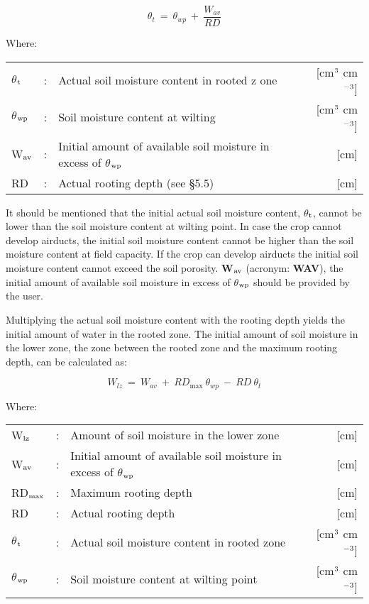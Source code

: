 \begin{equation}
\label{eq:6.18}
\theta_{t} ~ =~\theta_{wp} ~+~{\frac{W_{av}}{RD}}
\end{equation}

Where:\\[5pt]
\begin{tabularx}{\textwidth}{llXr}
	$\theta$$_{{\rm t}}$ &:& Actual soil moisture content in rooted z
	one  & [cm$^{{\rm 3}}$ cm$^{{\rm -3}}$]\\
	$\theta$$_{{\rm wp}}$ &:& Soil moisture content at wilting   & [cm$^{{\rm 3}}$ cm$^{{\rm -3}}$]\\
	W$_{{\rm av}}$ &:& Initial amount of available soil moisture 
	in excess of $\theta$$_{{\rm wp}}$ & [cm]\\
	RD &:& Actual rooting depth (see \S 5.5) & [cm]\\
\end{tabularx}

It should be mentioned that the initial actual soil moisture content, $\theta$$_{{\rm t}}$, cannot be lower
than the soil moisture content at wilting point. In case the crop cannot develop airducts,
the initial soil moisture content cannot be higher than the soil moisture content at field
capacity. If the crop can develop airducts the initial soil moisture content cannot exceed
the soil porosity. {\bf W$_{{\rm av}}$} (acronym: {\bf WAV}), the initial amount of available 
soil moisture in excess of $\theta$$_{{\rm wp}}$ should be provided by the user. 

Multiplying the actual soil moisture content with the rooting depth yields the initial
amount of water in the rooted zone. The initial amount of soil moisture in the lower zone,
the zone between the rooted zone and the maximum rooting depth, can be calculated as:

\begin{equation}
\label{eq:6.19}
W_{lz} ~ =~ W _{av} ~+~ RD_{\max } ~\theta_{wp} ~-~RD~\theta_{t} 
\end{equation}

Where:\\[5pt]
\begin{tabularx}{\textwidth}{llXr}
	W$_{{\rm lz}}$ &:& Amount of soil moisture in the lower zone & [cm]\\
	W$_{{\rm av}}$ &:& Initial amount of available soil moisture 
	in excess of $\theta$$_{{\rm wp}}$ & [cm]\\
	RD$_{{\rm max}}$ &:& Maximum rooting depth & [cm]\\
	RD &:& Actual rooting depth & [cm]\\
	$\theta$$_{{\rm t}}$ &:& Actual soil moisture content in rooted zone  
	& [cm$^{{\rm 3}}$ cm$^{{\rm -3}}$]\\
	$\theta$$_{{\rm wp}}$ &:& Soil moisture content at wilting point  
	& [cm$^{{\rm 3}}$ cm$^{{\rm -3}}$]\\
\end{tabularx}

